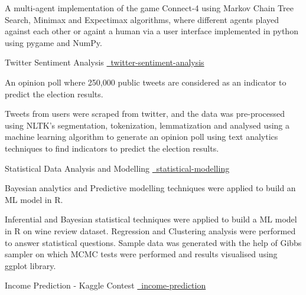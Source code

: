 \begin{cventries}
{\begin{cvitems}
      {
      A multi-agent implementation of the game Connect-4 using Markov Chain Tree Search, Minimax and Expectimax algorithms, where different agents played against each other or againt a human via a user interface implemented in python using pygame and NumPy.
      }
      \end{cvitems}
    }
  \cvproject
    {Twitter Sentiment Analysis}
    {
    {}
    {\href{https://github.com/mukeshmk/twitter-sentiment-analysis}{\faGithubSquare\ twitter-sentiment-analysis}}
    }
    {}
    {
      \begin{cvitems}
      \vspace{-0.5ex}
      {
      \item {An opinion poll where 250,000 public tweets are considered as an indicator to predict the election results.}
      }
      {
      Tweets from users were scraped from twitter, and the data was pre-processed using NLTK's segmentation, tokenization, lemmatization and analysed using a machine learning algorithm to generate an opinion poll using text analytics techniques to find indicators to predict the election results.
      }
      \end{cvitems}
    }
  \cvproject
    {Statistical Data Analysis and Modelling}
    {
    {}
    {\href{https://github.com/mukeshmk/statistical-modelling}{\faGithubSquare\ statistical-modelling}}
    }
    {}
    {
      \begin{cvitems}
      \vspace{-0.5ex}
      {
      \item {}Bayesian analytics and Predictive modelling techniques were applied to build an ML model in R.
      }
      {
      Inferential and Bayesian statistical techniques were applied to build a ML model in R on wine review dataset. Regression and Clustering analysis were performed to answer statistical questions. Sample data was generated with the help of Gibbs sampler on which MCMC tests were performed and results visualised using ggplot library.
      }
      \end{cvitems}
    }
  \cvproject
    {Income Prediction - Kaggle Contest}
    {
    {}
    {\href{https://github.com/mukeshmk/tcdml1920-income-ind}{\faGithubSquare\ income-prediction}}
}
\end{cventries}
